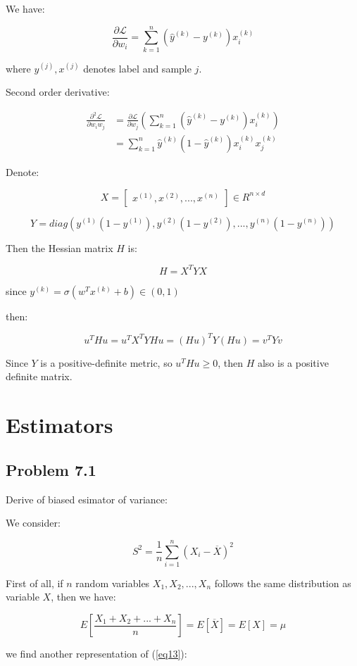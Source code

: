 \documentclass{article}
\begin{document}
We have:

$$
\frac{\partial \mathcal{L}}{\partial w_i} = \sum_{k=1}^n(\hat{y}^{(k)}-y^{(k)})x^{(k)}_i
$$

where $y^{(j)},x^{(j)}$ denotes label and sample $j$.

Second order derivative:

$$
\begin{aligned}
    \frac{\partial^2 \mathcal{L}}{\partial w_iw_j}&=\frac{\partial \mathcal{L}}{\partial w_j}(\sum_{k=1}^n(\hat{y}^{(k)}-y^{(k)})x^{(k)}_i)\\
    &=\sum_{k=1}^n\hat{y}^{(k)}(1-\hat{y}^{(k)})x_i^{(k)}x_j^{(k)}
\end{aligned}
$$

Denote:

$$
X=\begin{bmatrix}
    x^{(1)}, x^{(2)},...,x^{(n)}
\end{bmatrix}\in R^{n\times d}
$$

$$
Y=diag(y^{(1)}(1-y^{(1)}),y^{(2)}(1-y^{(2)}),...,y^{(n)}(1-y^{(n)}))
$$

Then the Hessian matrix $H$ is:

$$
H=X^TYX
$$

since $y^{(k)}=\sigma(w^Tx^{(k)}+b)\in (0,1)$

then:

$$
u^THu=u^TX^TYHu=(Hu)^TY(Hu)=v^TYv
$$

Since $Y$ is a positive-definite metric, so $u^THu\geq 0$, then $H$ also is a positive definite matrix.
\section{Estimators}
\subsection{Problem 7.1}

Derive of biased esimator of variance:

We consider:

\begin{equation}\label{eq13}
    S^2=\frac{1}{n}\sum_{i=1}^n(X_i-\overline{X})^2
\end{equation}

First of all, if $n$ random variables $X_1,X_2,...,X_n$ follows the same distribution as variable $X$, then we have:

$$
E[\frac{X_1+X_2+...+X_n}{n}]=E[\overline{X}] = E[X]=\mu
$$

we find another representation of (\ref{eq13}):
\end{document}
